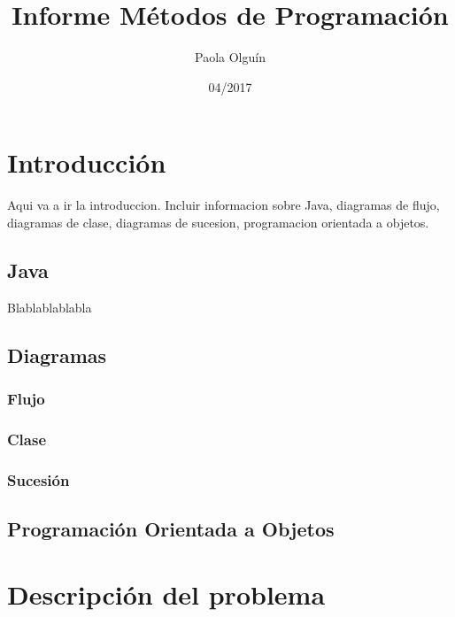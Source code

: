 \documentclass[spanish]{article}
\title{Informe Métodos de Programación}
\date{04/2017}
\author{Paola Olgu\'in}
\begin{document}

  \maketitle{}

  \newpage


  \tableofcontents{}

  \section{Introducción}
  Aqui va a ir la introduccion. Incluir informacion sobre Java, diagramas de flujo,
  diagramas de clase, diagramas de sucesion, programacion orientada a objetos.

  \subsection{Java}
  Blablablablabla

  \subsection{Diagramas}
  \subsubsection{Flujo}
  \subsubsection{Clase}
  \subsubsection{Sucesi\'on}
  \subsection{Programaci\'on Orientada a Objetos}
  \newpage
  \section{Descripci\'on del problema}
\end{document}
